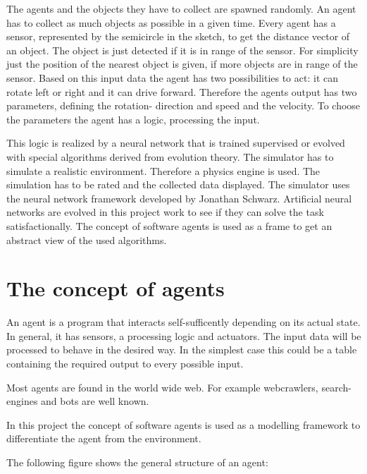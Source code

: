\documentclass[10pt,a4paper,DIV=11]{scrreprt}
\begin{document}
The agents and the objects they have to collect are spawned randomly. An agent has to collect as much objects as possible in a given time. Every agent has a sensor, represented by the semicircle in the sketch, to get the distance vector of an object.
The object is just detected if it is in range of the sensor. For simplicity just the position of the nearest object is given, if more objects are in range of the sensor. Based on this input data the agent has two possibilities to act: it can rotate left or right and it can drive forward. Therefore the agents output has two parameters, defining the rotation- direction and speed and the velocity.
To choose the parameters the agent has a logic, processing the input.

This logic is realized  by a neural network that is trained supervised or evolved with special algorithms derived from evolution theory.
The simulator has to simulate a realistic environment. Therefore a physics engine is used.
The simulation has to be rated and the collected data displayed. The simulator uses the neural network framework developed by Jonathan Schwarz.
Artificial neural networks are evolved in this project work to see if they can solve the task satisfactionally.
The concept of software agents is used as a frame to get an abstract view of the used algorithms. \\




\chapter{The concept of agents}
An agent is a program that interacts self-sufficently depending on its actual state. In general, it has sensors, a processing logic and actuators. The input data will be processed to behave in the desired way. In the simplest case this could be a table containing the required output to every possible input.

Most agents are found in the world wide web. For example webcrawlers, search-engines and bots are well known.

In this project the concept of software agents is used as a modelling framework to differentiate the agent from the environment.

The following figure shows the general structure of an agent:
\end{document}
